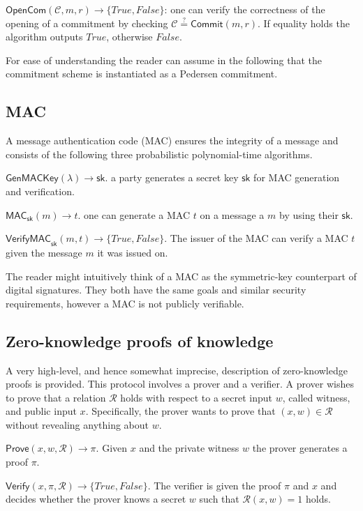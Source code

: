 \documentclass{article}
\begin{document}
\noindent$\mathsf{OpenCom}(\mathcal{C},m,r)\xrightarrow{}\{\mathit{True},\mathit{False}\}$: one can verify the correctness of the opening of a commitment by checking $\mathcal{C}\stackrel{?}{=}\mathsf{Commit}(m,r)$. If equality holds the algorithm outputs $\mathit{True}$, otherwise $\mathit{False}$.

For ease of understanding the reader can assume in the following that the commitment scheme is instantiated as a Pedersen commitment.

\subsection{MAC}
A message authentication code (MAC) ensures the integrity of a message and consists of the following three probabilistic polynomial-time algorithms.

\noindent$\mathsf{GenMACKey}(\lambda)\xrightarrow{}{\mathsf{sk}}$. a party generates a secret key $\mathsf{sk}$ for MAC generation and verification.

\noindent$\mathsf{MAC}_{\mathsf{sk}}(m)\xrightarrow{}t$. one can generate a MAC $t$ on a message a $m$ by using their $\mathsf{sk}$.

\noindent$\mathsf{VerifyMAC}_{\mathsf{sk}}(m,t)\xrightarrow{}\{\mathit{True},\mathit{False}\}$. The issuer of the MAC can verify a MAC $t$ given the message $m$ it was issued on.

The reader might intuitively think of a MAC as the symmetric-key counterpart of digital signatures. They both have the same goals and similar security requirements, however a MAC is not publicly verifiable.

\subsection{Zero-knowledge proofs of knowledge}
A very high-level, and hence somewhat imprecise, description of zero-knowledge proofs is provided. This protocol involves a prover and a verifier. A prover wishes to prove that a relation $\mathcal{R}$ holds with respect to a secret input $w$, called witness, and public input $x$. Specifically, the prover wants to prove that $(x, w) \in \mathcal{R}$ without revealing anything about $w$.

\noindent$\mathsf{Prove}(x,w,\mathcal{R})\xrightarrow{}\pi$. Given $x$ and the private witness $w$ the prover generates a proof $\pi$.

\noindent$\mathsf{Verify}(x,\pi,\mathcal{R})\xrightarrow{}\{\mathit{True},\mathit{False}\}$. The verifier is given the proof $\pi$ and $x$ and decides whether the prover knows a secret $w$ such that $\mathcal{R}(x,w)=1$ holds.
\end{document}
